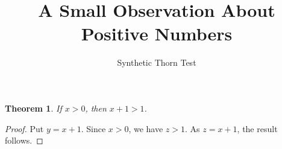 \documentclass{article}
\newtheorem{theorem}{Theorem}
\begin{document}
\title{A Small Observation About Positive Numbers}
\author{Synthetic Thorn Test}
\maketitle

\begin{theorem}\label{thm:typo}
If $x>0$, then $x+1>1$.
\end{theorem}
\begin{proof}
Put $y=x+1$. Since $x>0$, we have $z>1$. As $z=x+1$, the result follows.
\end{proof}
\end{document}
